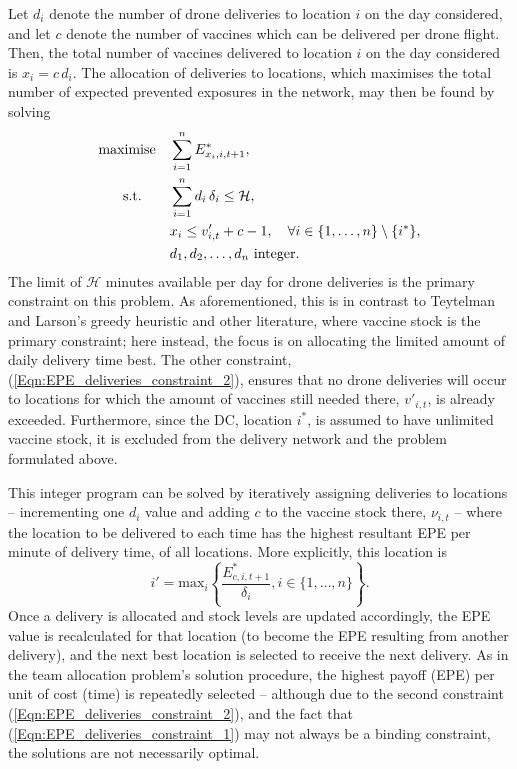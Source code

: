 \documentclass[10pt,letterpaper]{article}
\begin{document}
Let $d_{i}$ denote the number of drone deliveries to location $i$ on the day considered, and let $c$ denote the number of vaccines which can be delivered per drone flight. Then, the total number of vaccines delivered to location $i$ on the day considered is $x_{i} = c \, d_{i}$. The allocation of deliveries to locations, which maximises the total number of expected prevented exposures in the network, may then be found by solving 
\begin{align}
    \text{maximise\quad} & \sum_{i=1}^{n} E^{*}_{x_{i},i,t+1}, \\
    \label{Eqn:EPE_deliveries_constraint_1}
    \text{s.t.\qquad} & \sum_{i=1}^{n} d_{i}\,\delta_{i} \leq \mathcal{H}, \\
    \label{Eqn:EPE_deliveries_constraint_2}
    &x_{i} \leq v'_{i,t} + c - 1, \quad \forall{i} \in \{1, \dots,n \} \setminus \{i^*\},\\
    &d_{1}, d_{2}, \ldots, d_{n} \text{ integer}.
\end{align}
The limit of $\mathcal{H}$ minutes available per day for drone deliveries is the primary constraint on this problem. As aforementioned, this is in contrast to Teytelman and Larson's greedy heuristic and other literature, where vaccine stock is the primary constraint; here instead, the focus is on allocating the limited amount of daily delivery time best. The other constraint, (\ref{Eqn:EPE_deliveries_constraint_2}), ensures that no drone deliveries will occur to locations for which the amount of vaccines still needed there, $v'_{i,t}$, is already exceeded. Furthermore, since the DC, location $i^*$, is assumed to have unlimited vaccine stock, it is excluded from the delivery network and the problem formulated above.

This integer program can be solved by iteratively assigning deliveries to locations -- incrementing one $d_{i}$ value and adding $c$ to the vaccine stock there, $\nu_{i,t}$ -- where the location to be delivered to each time has the highest resultant EPE per minute of delivery time, of all locations. More explicitly, this location is $$i' = \text{max}_{i} \left\{ \frac{E^{*}_{c,i,t+1}}{\delta_{i}}, i \in \{1, \dots, n\} \right\}.$$ 
Once a delivery is allocated and stock levels are updated accordingly, the EPE value is recalculated for that location (to become the EPE resulting from another delivery), and the next best location is selected to receive the next delivery. As in the team allocation problem's solution procedure, the highest payoff (EPE) per unit of cost (time) is repeatedly selected -- although due to the second constraint (\ref{Eqn:EPE_deliveries_constraint_2}), and the fact that (\ref{Eqn:EPE_deliveries_constraint_1}) may not always be a binding constraint, the solutions are not necessarily optimal.
\end{document}
